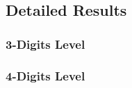 \documentclass[11pt,twoside, authoryear]{elsarticle}
\begin{document}
%
%
%
%			
%			
%					
%
%
%
%









\subsection{Detailed Results \label{secoa:detailed}}
\setcounter{table}{0}
\renewcommand{\thetable}{B.\arabic{table}}


\subsubsection{3-Digits Level}

\subsubsection{4-Digits Level}
\end{document}
